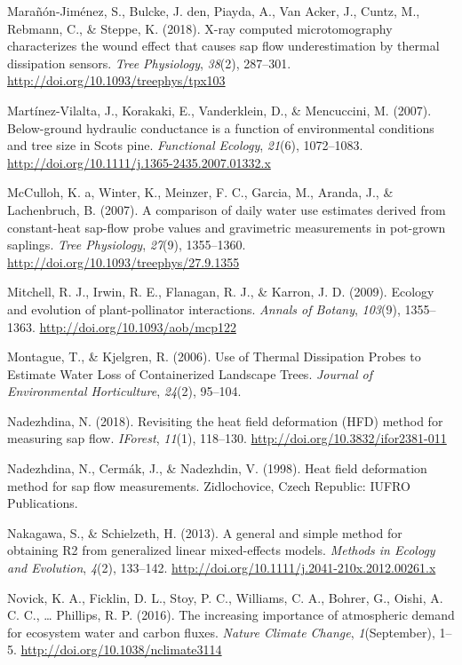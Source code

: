 \documentclass[11pt,twoside]{reedthesis}
\begin{document}
\hypertarget{ref-Maranon-jimenez2018}{}
Marañón-Jiménez, S., Bulcke, J. den, Piayda, A., Van Acker, J., Cuntz,
M., Rebmann, C., \& Steppe, K. (2018). X-ray computed microtomography
characterizes the wound effect that causes sap flow underestimation by
thermal dissipation sensors. \emph{Tree Physiology}, \emph{38}(2),
287--301. \url{http://doi.org/10.1093/treephys/tpx103}

\hypertarget{ref-Martinez-Vilalta2007}{}
Martínez-Vilalta, J., Korakaki, E., Vanderklein, D., \& Mencuccini, M.
(2007). Below-ground hydraulic conductance is a function of
environmental conditions and tree size in Scots pine. \emph{Functional
Ecology}, \emph{21}(6), 1072--1083.
\url{http://doi.org/10.1111/j.1365-2435.2007.01332.x}

\hypertarget{ref-McCulloh2007}{}
McCulloh, K. a, Winter, K., Meinzer, F. C., Garcia, M., Aranda, J., \&
Lachenbruch, B. (2007). A comparison of daily water use estimates
derived from constant-heat sap-flow probe values and gravimetric
measurements in pot-grown saplings. \emph{Tree Physiology},
\emph{27}(9), 1355--1360.
\url{http://doi.org/10.1093/treephys/27.9.1355}

\hypertarget{ref-Mitchell2009}{}
Mitchell, R. J., Irwin, R. E., Flanagan, R. J., \& Karron, J. D. (2009).
Ecology and evolution of plant-pollinator interactions. \emph{Annals of
Botany}, \emph{103}(9), 1355--1363.
\url{http://doi.org/10.1093/aob/mcp122}

\hypertarget{ref-Montague2006}{}
Montague, T., \& Kjelgren, R. (2006). Use of Thermal Dissipation Probes
to Estimate Water Loss of Containerized Landscape Trees. \emph{Journal
of Environmental Horticulture}, \emph{24}(2), 95--104.

\hypertarget{ref-Nadezhdina2018}{}
Nadezhdina, N. (2018). Revisiting the heat field deformation (HFD)
method for measuring sap flow. \emph{IForest}, \emph{11}(1), 118--130.
\url{http://doi.org/10.3832/ifor2381-011}

\hypertarget{ref-Nadezhdina1998}{}
Nadezhdina, N., Cermák, J., \& Nadezhdin, V. (1998). Heat field
deformation method for sap flow measurements. Zidlochovice, Czech
Republic: IUFRO Publications.

\hypertarget{ref-Nakagawa2013}{}
Nakagawa, S., \& Schielzeth, H. (2013). A general and simple method for
obtaining R2 from generalized linear mixed-effects models. \emph{Methods
in Ecology and Evolution}, \emph{4}(2), 133--142.
\url{http://doi.org/10.1111/j.2041-210x.2012.00261.x}

\hypertarget{ref-Novick2016}{}
Novick, K. A., Ficklin, D. L., Stoy, P. C., Williams, C. A., Bohrer, G.,
Oishi, A. C. C., \ldots{} Phillips, R. P. (2016). The increasing
importance of atmospheric demand for ecosystem water and carbon fluxes.
\emph{Nature Climate Change}, \emph{1}(September), 1--5.
\url{http://doi.org/10.1038/nclimate3114}
\end{document}
